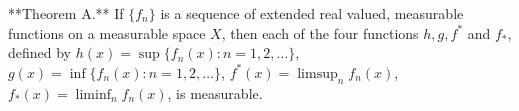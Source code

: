 **Theorem A.** If $\{f_n\}$ is a sequence of extended real valued, measurable functions on a measurable space $X$, then each of the four functions $h, g, f^*$ and $f_*$, defined by $h(x) = \sup\{f_n(x): n=1,2,\dots\}$, $g(x) = \inf\{f_n(x): n=1,2,\dots\}$, $f^*(x) = \limsup_n f_n(x)$, $f_*(x) = \liminf_n f_n(x)$, is measurable.
